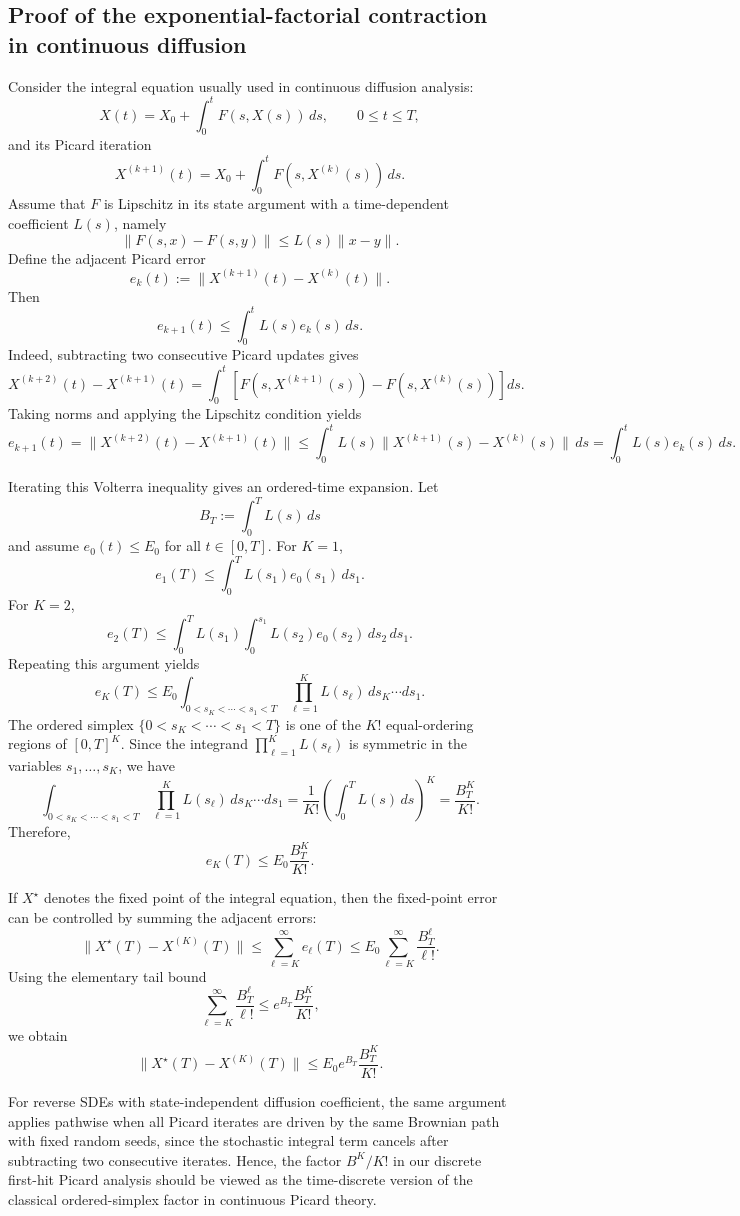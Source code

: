 \documentclass{article}
\begin{document}
\subsection{Proof of the exponential-factorial contraction in continuous diffusion}
\label{appd:con_dis}

Consider the integral equation usually used in continuous diffusion analysis:
\[
X(t)
=
X_0+\int_0^t F(s,X(s))\,ds,
\qquad 0\le t\le T,
\]
and its Picard iteration
\[
X^{(k+1)}(t)
=
X_0+\int_0^t F(s,X^{(k)}(s))\,ds.
\]
Assume that \(F\) is Lipschitz in its state argument with a time-dependent coefficient \(L(s)\), namely
\[
\|F(s,x)-F(s,y)\|
\le
L(s)\|x-y\|.
\]
Define the adjacent Picard error
\[
e_k(t):=\|X^{(k+1)}(t)-X^{(k)}(t)\|.
\]
Then
\[
e_{k+1}(t)
\le
\int_0^t L(s)e_k(s)\,ds.
\]
Indeed, subtracting two consecutive Picard updates gives
\[
X^{(k+2)}(t)-X^{(k+1)}(t)
=
\int_0^t
\left[
F(s,X^{(k+1)}(s))-F(s,X^{(k)}(s))
\right]ds.
\]
Taking norms and applying the Lipschitz condition yields
\[
e_{k+1}(t)
=
\|X^{(k+2)}(t)-X^{(k+1)}(t)\|
\le
\int_0^t L(s)\|X^{(k+1)}(s)-X^{(k)}(s)\|\,ds
=
\int_0^t L(s)e_k(s)\,ds.
\]

Iterating this Volterra inequality gives an ordered-time expansion. 
Let
\[
B_T:=\int_0^T L(s)\,ds
\]
and assume \(e_0(t)\le E_0\) for all \(t\in[0,T]\). 
For \(K=1\),
\[
e_1(T)
\le
\int_0^T L(s_1)e_0(s_1)\,ds_1.
\]
For \(K=2\),
\[
e_2(T)
\le
\int_0^T L(s_1)
\int_0^{s_1}L(s_2)e_0(s_2)\,ds_2\,ds_1.
\]
Repeating this argument yields
\[
e_K(T)
\le
E_0
\int_{0<s_K<\cdots<s_1<T}
\prod_{\ell=1}^K L(s_\ell)\,
ds_K\cdots ds_1.
\]
The ordered simplex \(\{0<s_K<\cdots<s_1<T\}\) is one of the \(K!\) equal-ordering regions of \([0,T]^K\). Since the integrand \(\prod_{\ell=1}^KL(s_\ell)\) is symmetric in the variables \(s_1,\ldots,s_K\), we have
\[
\int_{0<s_K<\cdots<s_1<T}
\prod_{\ell=1}^K L(s_\ell)\,
ds_K\cdots ds_1
=
\frac{1}{K!}
\left(\int_0^T L(s)\,ds\right)^K
=
\frac{B_T^K}{K!}.
\]
Therefore,
\[
e_K(T)
\le
E_0\frac{B_T^K}{K!}.
\]

If \(X^\star\) denotes the fixed point of the integral equation, then the fixed-point error can be controlled by summing the adjacent errors:
\[
\|X^\star(T)-X^{(K)}(T)\|
\le
\sum_{\ell=K}^{\infty} e_\ell(T)
\le
E_0\sum_{\ell=K}^{\infty}\frac{B_T^\ell}{\ell!}.
\]
Using the elementary tail bound
\[
\sum_{\ell=K}^{\infty}\frac{B_T^\ell}{\ell!}
\le
e^{B_T}\frac{B_T^K}{K!},
\]
we obtain
\[
\|X^\star(T)-X^{(K)}(T)\|
\le
E_0e^{B_T}\frac{B_T^K}{K!}.
\]

For reverse SDEs with state-independent diffusion coefficient, the same argument applies pathwise when all Picard iterates are driven by the same Brownian path with fixed random seeds, since the stochastic integral term cancels after subtracting two consecutive iterates. Hence, the factor \(B^K/K!\) in our discrete first-hit Picard analysis should be viewed as the time-discrete version of the classical ordered-simplex factor in continuous Picard theory. 
\end{document}
